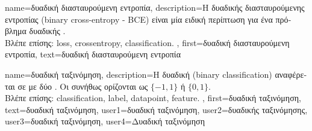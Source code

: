 {name={\foreignlanguage{greek}{δυαδική διασταυρούμενη εντροπία}},
	description={\foreignlanguage{greek}{Η}  
		\foreignlanguage{greek}{δυαδικής διασταυρούμενης εντροπίας} (binary cross-entropy - BCE) \foreignlanguage{greek}{είναι μία ειδική 
		περίπτωση}   \foreignlanguage{greek}{για ένα πρόβλημα δυαδικής} .
		\\
		\foreignlanguage{greek}{Βλέπε επίσης:} \gls{loss}, \gls{crossentropy}, \gls{classification}. }, 
 	first={\foreignlanguage{greek}{δυαδική διασταυρούμενη εντροπία}},
 	text={\foreignlanguage{greek}{δυαδική διασταυρούμενη εντροπία}}
}

{name={\foreignlanguage{greek}{δυαδική ταξινόμηση}}, 
	description={\foreignlanguage{greek}{Η δυαδική}  
		(binary classification) \foreignlanguage{greek}{αναφέρεται σε}  
		\foreignlanguage{greek}{με δύο} . \foreignlanguage{greek}{Οι}  
		\foreignlanguage{greek}{συνήθως ορίζονται ως $\{-1, 1\}$ ή} $\{0, 1\}$. 
		\\ 
		\foreignlanguage{greek}{Βλέπε επίσης:} \gls{classification}, \gls{label}, \gls{datapoint}, \gls{feature}. },
	first={\foreignlanguage{greek}{δυαδική ταξινόμηση}},
	text={\foreignlanguage{greek}{δυαδική ταξινόμηση}},
	user1={\foreignlanguage{greek}{δυαδική ταξινόμηση}}, %
  	user2={\foreignlanguage{greek}{δυαδικής ταξινόμησης}}, %
	user3={\foreignlanguage{greek}{δυαδική ταξινόμηση}}, %
	user4={\foreignlanguage{greek}{Δυαδική ταξινόμηση}} %
}

